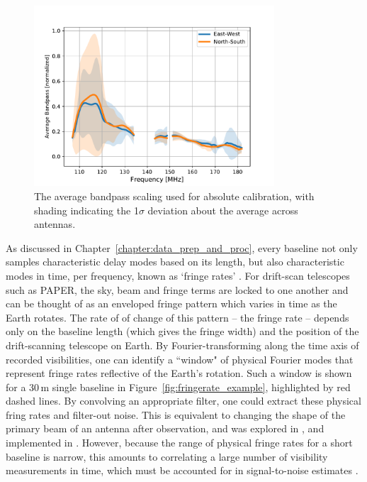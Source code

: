 \begin{figure}
\centering
\includegraphics[width=0.8\textwidth]{chapters/psa128_pol/figures/avg_bandpasses.pdf}
\caption[The average bandpass scaling used for absolute calibration.]{The average bandpass scaling used for absolute calibration, with shading indicating the 1$\sigma$ deviation about the average across antennas.}
\label{fig:psa128_bandpases}
\end{figure}

As discussed in Chapter~\ref{chapter:data_prep_and_proc}, every baseline not only samples characteristic delay modes based on its length, but also characteristic modes in time, per frequency, known as `fringe rates' \citep[if frequency dependence is ignored, they are referred to as ``delay rates"; e.g.][]{ParsonsBacker.09}. For drift-scan telescopes such as PAPER, the sky, beam and fringe terms are locked to one another and can be thought of as an enveloped fringe pattern which varies in time as the Earth rotates. The rate of of change of this pattern -- the fringe rate -- depends only on the baseline length (which gives the fringe width) and the position of the drift-scanning telescope on Earth. By Fourier-transforming along the time axis of recorded visibilities, one can identify a ``window" of physical Fourier modes that represent fringe rates reflective of the Earth's rotation. Such a window is shown for a 30\,m single baseline in Figure~\ref{fig:fringerate_example}, highlighted by red dashed lines. By convolving an appropriate filter, one could extract these physical fring rates and filter-out noise. This is equivalent to changing the shape of the primary beam of an antenna after observation, and was explored in \cite{Parsons.15}, and implemented in \cite{Ali.15}. However, because the range of physical fringe rates for a short baseline is narrow, this amounts to correlating a large number of visibility measurements in time, which must be accounted for in signal-to-noise estimates \citep[][{\color{red} Cheng et al. (2018)}]{Ali.15}.

